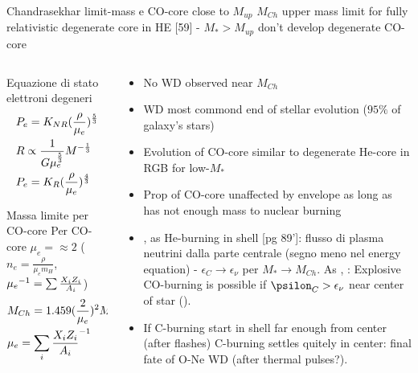 \begin{frame}{Chandrasekhar limit-mass e CO-core close to $M_{up}$}
$M_{Ch}$ upper mass limit for fully relativistic degenerate core in HE [59] - $M_*>M_{up}$ don't develop degenerate CO-core
\begin{columns}[T]
\begin{column}{0.4\textwidth}
\begin{block}{Equazione di stato elettroni degeneri}
\begin{align*}
&P_e=K_{NR}(\frac{\rho}{\mu_e})^{\frac{5}{3}}\\
&R\propto \frac{1}{G\mu_e^{\frac{5}{3}}}M^{-\frac{1}{3}}\\
&P_e=K_R(\frac{\rho}{\mu_e})^{\frac{4}{3}}
\end{align*}
\end{block}
\begin{block}{Massa limite per CO-core}
Per CO-core $\mu_e=\approx2$ ($n_e=\frac{\rho}{\mu_em_H}$, ${\mu_e}^{-1}=\sum\frac{X_iZ_i}{A_i}$)
\begin{align*}
&M_{Ch}=1.459(\frac{2}{\mu_e})^2M_{\odot}=1.46M_{\odot}\\
&\mu_e={\sum_i\frac{X_iZ_i}{A_i}}^{-1}
\end{align*}
\end{block}
\end{column}
\begin{column}{0.45\textwidth}
\begin{itemize}
\item No WD observed near $M_{Ch}$
\item WD most commond end of stellar evolution ($95\%$ of galaxy's stars)
\item Evolution of CO-core similar to degenerate He-core in RGB for low-$M_*$
\item Prop of CO-core unaffected by envelope as long as has not enough mass to nuclear burning
\item {},  as He-burning in shell [pg 89']: flusso di plasma neutrini dalla parte centrale \xaumenta{\epsilon_{\nu}}(segno meno nel energy equation) - $\epsilon_C\to\epsilon_{\nu}$ per $M_*\to M_{Ch}$. As , : Explosive CO-burning is possible if $\psilon_C>\epsilon_{\nu}$ near center of star ().

\item If C-burning start in shell far enough from center (after flashes) C-burning settles quitely in center: final fate of O-Ne WD (after thermal pulses?).
\end{itemize}
\end{column}
\end{columns}
\end{frame}

